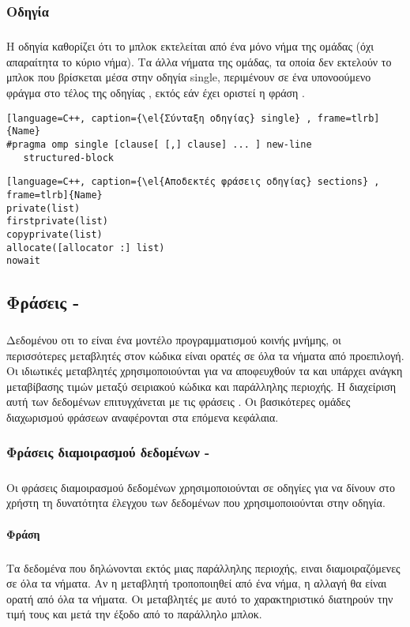 \subsubsection{Οδηγία }
\subparagraph{}
Η οδηγία  καθορίζει ότι το μπλοκ εκτελείται από ένα μόνο νήμα της ομάδας (όχι απαραίτητα το κύριο νήμα). Τα άλλα νήματα της ομάδας, τα οποία δεν εκτελούν το μπλοκ που βρίσκεται μέσα στην οδηγία single, περιμένουν σε ένα υπονοούμενο φράγμα στο τέλος της οδηγίας , εκτός εάν έχει οριστεί η φράση  \cite{openmpse16}.

\begin{lstlisting}[language=C++, caption={\el{Σύνταξη οδηγίας} single} , frame=tlrb]{Name} 
#pragma omp single [clause[ [,] clause] ... ] new-line 
   structured-block
\end{lstlisting}

\begin{lstlisting}[language=C++, caption={\el{Αποδεκτές φράσεις οδηγίας} sections} , frame=tlrb]{Name}
private(list) 
firstprivate(list) 
copyprivate(list) 
allocate([allocator :] list) 
nowait
\end{lstlisting}

\clearpage
\subsection{Φράσεις - }
\subparagraph{}
Δεδομένου οτι το  είναι ένα μοντέλο προγραμματισμού κοινής μνήμης, οι περισσότερες μεταβλητές στον κώδικα  είναι ορατές σε όλα τα νήματα από προεπιλογή. Οι ιδιωτικές μεταβλητές χρησιμοποιούνται για να αποφευχθούν τα  και υπάρχει ανάγκη μεταβίβασης τιμών μεταξύ σειριακού κώδικα και παράλληλης περιοχής. Η διαχείριση αυτή των δεδομένων επιτυγχάνεται με τις φράσεις \emph{}. Οι βασικότερες ομάδες διαχωρισμού φράσεων αναφέρονται στα επόμενα κεφάλαια.

\subsubsection{Φράσεις διαμοιρασμού δεδομένων - }
\subparagraph{}
Οι φράσεις διαμοιρασμού δεδομένων χρησιμοποιούνται σε οδηγίες για να δίνουν στο χρήστη τη δυνατότητα έλεγχου των δεδομένων που χρησιμοποιούνται στην οδηγία.

\paragraph{Φράση }
\subparagraph{}
Τα δεδομένα που δηλώνονται εκτός μιας παράλληλης περιοχής, ειναι διαμοιραζόμενες σε όλα τα νήματα. Αν η μεταβλητή τροποποιηθεί από ένα νήμα, η αλλαγή θα είναι ορατή από όλα τα νήματα. Οι μεταβλητές με αυτό το χαρακτηριστικό διατηρούν την τιμή τους και μετά την έξοδο από το παράλληλο μπλοκ.

